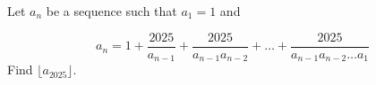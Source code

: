 Let $a_n$ be a sequence such that $a_1=1$ and

$$a_n=1+\dfrac{2025}{a_{n-1}}+\dfrac{2025}{a_{n-1}a_{n-2}}+\dots+\dfrac{2025}{a_{n-1}a_{n-2}\dots a_1}$$Find $\lfloor a_{2025}\rfloor$.
